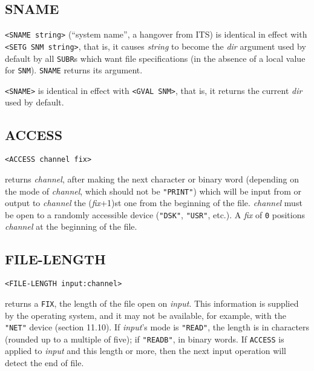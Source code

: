 \documentclass[a4paper]{scrbook}
\begin{document}
\subsection{SNAME}\label{sname}

\texttt{\textless{}SNAME\ string\textgreater{}}  (``system name'', a hangover from ITS) is
identical in effect with \texttt{\textless{}SETG\ SNM\ string\textgreater{}}, that is, it causes
\emph{string} to become the \emph{dir} argument used by default by all \texttt{SUBR}s which want file specifications (in
the absence of a local value for \texttt{SNM}). \texttt{SNAME} returns its argument.

\texttt{\textless{}SNAME\textgreater{}} is identical in effect with \texttt{\textless{}GVAL\ SNM\textgreater{}}, that is,
it returns the current \emph{dir} used by default.

\subsection{ACCESS}\label{access}

\begin{verbatim}
<ACCESS channel fix>
\end{verbatim}

 returns \emph{channel}, after making the next character or binary word (depending on the
mode of \emph{channel}, which should not be \texttt{"PRINT"}) which will be input from or output to \emph{channel} the
(\emph{fix}+1)st one from the beginning of the file. \emph{channel} must be open to a randomly accessible device
(\texttt{"DSK"}, \texttt{"USR"}, etc.). A \emph{fix} of \texttt{0} positions \emph{channel} at the beginning of the file.

\subsection{FILE-LENGTH}\label{file-length}

\begin{verbatim}
<FILE-LENGTH input:channel>
\end{verbatim}

 returns a \texttt{FIX}, the length of the file open on \emph{input}. This information
is supplied by the operating system, and it may not be available, for example, with the \texttt{"NET"} device (section
11.10). If \emph{input}'s mode is \texttt{"READ"}, the length is in characters (rounded up to a multiple of five); if
\texttt{"READB"}, in binary words. If \texttt{ACCESS} is applied to \emph{input} and this length or more, then the next
input operation will detect the end of file.
\end{document}
